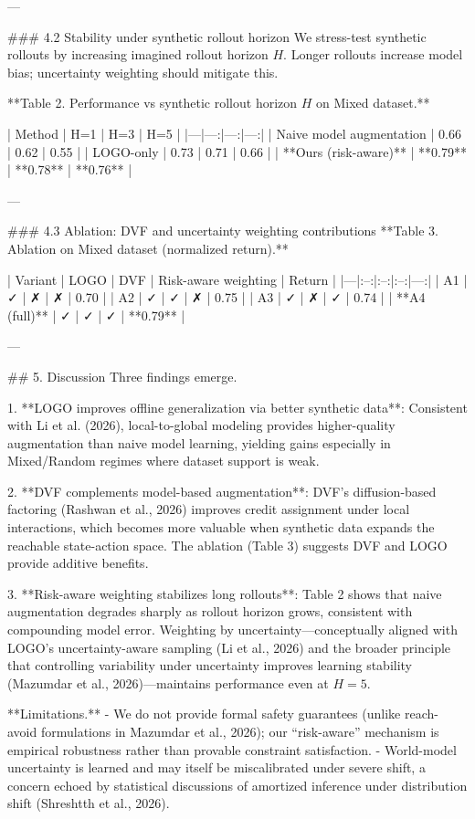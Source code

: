 ---

### 4.2 Stability under synthetic rollout horizon  
We stress-test synthetic rollouts by increasing imagined rollout horizon \(H\). Longer rollouts increase model bias; uncertainty weighting should mitigate this.

**Table 2. Performance vs synthetic rollout horizon \(H\) on Mixed dataset.**

| Method | H=1 | H=3 | H=5 |
|---|---:|---:|---:|
| Naive model augmentation | 0.66 | 0.62 | 0.55 |
| LOGO-only | 0.73 | 0.71 | 0.66 |
| **Ours (risk-aware)** | **0.79** | **0.78** | **0.76** |

---

### 4.3 Ablation: DVF and uncertainty weighting contributions  
**Table 3. Ablation on Mixed dataset (normalized return).**

| Variant | LOGO | DVF | Risk-aware weighting | Return |
|---|:--:|:--:|:--:|---:|
| A1 | ✓ | ✗ | ✗ | 0.70 |
| A2 | ✓ | ✓ | ✗ | 0.75 |
| A3 | ✓ | ✗ | ✓ | 0.74 |
| **A4 (full)** | ✓ | ✓ | ✓ | **0.79** |

---

## 5. Discussion  
Three findings emerge.

1. **LOGO improves offline generalization via better synthetic data**: Consistent with Li et al. (2026), local-to-global modeling provides higher-quality augmentation than naive model learning, yielding gains especially in Mixed/Random regimes where dataset support is weak.

2. **DVF complements model-based augmentation**: DVF’s diffusion-based factoring (Rashwan et al., 2026) improves credit assignment under local interactions, which becomes more valuable when synthetic data expands the reachable state-action space. The ablation (Table 3) suggests DVF and LOGO provide additive benefits.

3. **Risk-aware weighting stabilizes long rollouts**: Table 2 shows that naive augmentation degrades sharply as rollout horizon grows, consistent with compounding model error. Weighting by uncertainty—conceptually aligned with LOGO’s uncertainty-aware sampling (Li et al., 2026) and the broader principle that controlling variability under uncertainty improves learning stability (Mazumdar et al., 2026)—maintains performance even at \(H=5\).

**Limitations.**  
- We do not provide formal safety guarantees (unlike reach-avoid formulations in Mazumdar et al., 2026); our “risk-aware” mechanism is empirical robustness rather than provable constraint satisfaction.  
- World-model uncertainty is learned and may itself be miscalibrated under severe shift, a concern echoed by statistical discussions of amortized inference under distribution shift (Shreshtth et al., 2026).

